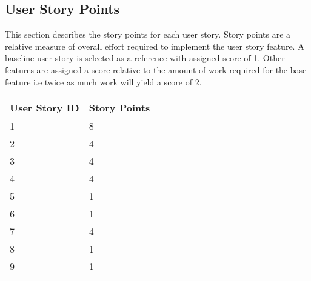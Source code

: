 \documentclass[11pt]{article}
\begin{document}
\subsection{User Story Points}
This section describes the story points for each user story. Story points are a relative measure of overall effort required to implement the user story feature. A baseline user story is selected as a reference with assigned score of 1. Other features are assigned a score relative to the amount of work required for the base feature i.e twice as much work will yield a score of 2.

\begin{table}[H]
	\begin{tabular}{@{}|l||l|@{}}
		\toprule
			\textbf{User Story ID}          & \textbf{Story Points }         \\ \midrule
		1 & 8	\\ \midrule
		2 & 4	\\ \midrule
	    3 & 4	\\ \midrule
		4 & 4	\\ \midrule
		5 & 1	\\ \midrule
		6 & 1	\\ \midrule
		7 & 4	\\ \midrule
		8 & 1	\\ \midrule
		9 & 1	\\ \bottomrule
	\end{tabular}
\end{table}
\end{document}
